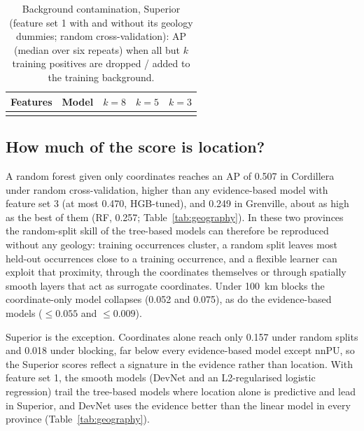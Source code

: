 \documentclass[pdflatex,sn-apa]{sn-jnl}
\begin{document}
\begin{table}[t]
\caption{Background contamination, Superior (feature set 1 with and without its geology dummies; random cross-validation): AP (median over six repeats) when all but $k$ training positives are dropped / added to the training background.}\label{tab:contamination}
\footnotesize
\begin{tabular*}{\textwidth}{@{\extracolsep\fill}llccc}
\toprule
Features & Model & $k = 8$ & $k = 5$ & $k = 3$ \\
\midrule
\botrule
\end{tabular*}
\end{table}

\subsection{How much of the score is location?}\label{sec:res-geography}

A random forest given only coordinates reaches an AP of 0.507 in Cordillera under random cross-validation, higher than any evidence-based model with feature set 3 (at most 0.470, HGB-tuned), and 0.249 in Grenville, about as high as the best of them (RF, 0.257; Table~\ref{tab:geography}). In these two provinces the random-split skill of the tree-based models can therefore be reproduced without any geology: training occurrences cluster, a random split leaves most held-out occurrences close to a training occurrence, and a flexible learner can exploit that proximity, through the coordinates themselves or through spatially smooth layers that act as surrogate coordinates. Under 100~km blocks the coordinate-only model collapses (0.052 and 0.075), as do the evidence-based models ($\leq 0.055$ and $\leq 0.009$).

Superior is the exception. Coordinates alone reach only 0.157 under random splits and 0.018 under blocking, far below every evidence-based model except nnPU, so the Superior scores reflect a signature in the evidence rather than location. With feature set 1, the smooth models (DevNet and an L2-regularised logistic regression) trail the tree-based models where location alone is predictive and lead in Superior, and DevNet uses the evidence better than the linear model in every province (Table~\ref{tab:geography}).
\end{document}
